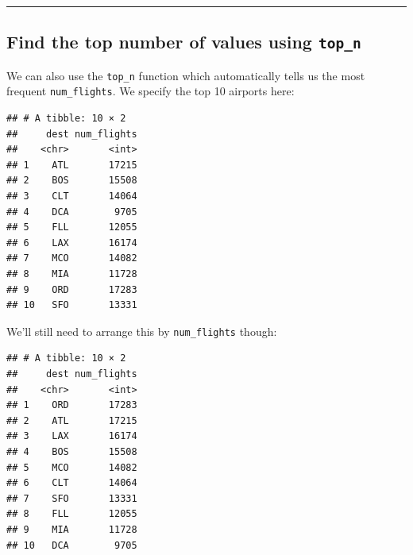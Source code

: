 \documentclass[]{tufte-book}
\newenvironment{Shaded}{\begin{snugshade}}{\end{snugshade}}
\newcommand{\KeywordTok}[1]{\textcolor[rgb]{0.13,0.29,0.53}{\textbf{{#1}}}}
\newcommand{\DataTypeTok}[1]{\textcolor[rgb]{0.13,0.29,0.53}{{#1}}}
\newcommand{\DecValTok}[1]{\textcolor[rgb]{0.00,0.00,0.81}{{#1}}}
\newcommand{\StringTok}[1]{\textcolor[rgb]{0.31,0.60,0.02}{{#1}}}
\newcommand{\NormalTok}[1]{{#1}}
\let\oldrule=\rule
\renewcommand{\rule}[1]{\oldrule{\linewidth}}
\begin{document}
\begin{center}\rule{0.5\linewidth}{\linethickness}\end{center}

\subsection{\texorpdfstring{Find the top number of values using
\texttt{top\_n}}{Find the top number of values using top\_n}}\label{find-the-top-number-of-values-using-top_n}

We can also use the \texttt{top\_n} function which automatically tells
us the most frequent \texttt{num\_flights}. We specify the top 10
airports here:

\begin{Shaded}
\end{Shaded}

\begin{verbatim}
## # A tibble: 10 × 2
##     dest num_flights
##    <chr>       <int>
## 1    ATL       17215
## 2    BOS       15508
## 3    CLT       14064
## 4    DCA        9705
## 5    FLL       12055
## 6    LAX       16174
## 7    MCO       14082
## 8    MIA       11728
## 9    ORD       17283
## 10   SFO       13331
\end{verbatim}

We'll still need to arrange this by \texttt{num\_flights} though:

\begin{Shaded}
\end{Shaded}

\begin{verbatim}
## # A tibble: 10 × 2
##     dest num_flights
##    <chr>       <int>
## 1    ORD       17283
## 2    ATL       17215
## 3    LAX       16174
## 4    BOS       15508
## 5    MCO       14082
## 6    CLT       14064
## 7    SFO       13331
## 8    FLL       12055
## 9    MIA       11728
## 10   DCA        9705
\end{verbatim}
\end{document}
